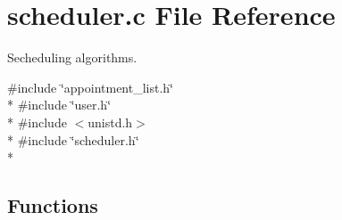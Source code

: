 \section{scheduler.\+c File Reference}
\label{scheduler_8c}


Secheduling algorithms.  


{\ttfamily \#include \char`\"{}appointment\+\_\+list.\+h\char`\"{}}\\*
{\ttfamily \#include \char`\"{}user.\+h\char`\"{}}\\*
{\ttfamily \#include $<$unistd.\+h$>$}\\*
{\ttfamily \#include \char`\"{}scheduler.\+h\char`\"{}}\\*
\subsection*{Functions}
